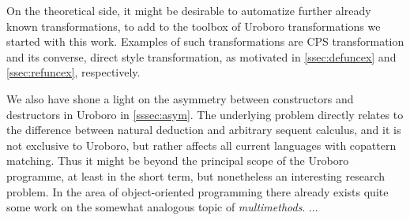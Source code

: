 On the theoretical side, it might be desirable to automatize further already known transformations, to add to the toolbox of Uroboro transformations we started with this work. Examples of such transformations are CPS transformation and its converse, direct style transformation, as motivated in \autoref{ssec:defuncex} and \autoref{ssec:refuncex}, respectively.

We also have shone a light on the asymmetry between constructors and destructors in Uroboro in \autoref{sssec:asym}. The underlying problem directly relates to the difference between natural deduction and arbitrary sequent calculus, and it is not exclusive to Uroboro, but rather affects all current languages with copattern matching. Thus it might be beyond the principal scope of the Uroboro programme, at least in the short term, but nonetheless an interesting research problem. In the area of object-oriented programming there already exists quite some work on the somewhat analogous topic of \textit{multimethods}. ...